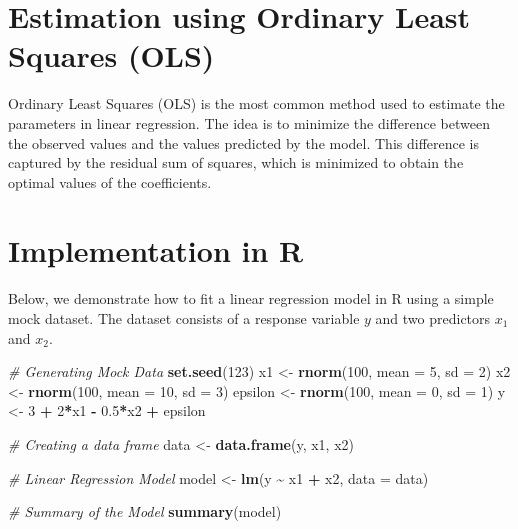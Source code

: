 \documentclass[
  12 pt,
  a4paper,
]{book}
\newenvironment{Shaded}{\begin{snugshade}}{\end{snugshade}}
\newcommand{\AttributeTok}[1]{\textcolor[rgb]{0.13,0.29,0.53}{#1}}
\newcommand{\CommentTok}[1]{\textcolor[rgb]{0.56,0.35,0.01}{\textit{#1}}}
\newcommand{\DecValTok}[1]{\textcolor[rgb]{0.00,0.00,0.81}{#1}}
\newcommand{\FloatTok}[1]{\textcolor[rgb]{0.00,0.00,0.81}{#1}}
\newcommand{\FunctionTok}[1]{\textcolor[rgb]{0.13,0.29,0.53}{\textbf{#1}}}
\newcommand{\NormalTok}[1]{#1}
\newcommand{\OtherTok}[1]{\textcolor[rgb]{0.56,0.35,0.01}{#1}}
\newcommand{\SpecialCharTok}[1]{\textcolor[rgb]{0.81,0.36,0.00}{\textbf{#1}}}
\numberwithin{equation}{section}
\theoremstyle{plain}      %
\theoremstyle{definition} %
\theoremstyle{remark}     %
\theoremstyle{note}         %
\begin{document}
\hypertarget{estimation-using-ordinary-least-squares-ols}{%
\section{Estimation using Ordinary Least Squares
(OLS)}\label{estimation-using-ordinary-least-squares-ols}}

Ordinary Least Squares (OLS) is the most common method used to estimate
the parameters in linear regression. The idea is to minimize the
difference between the observed values and the values predicted by the
model. This difference is captured by the residual sum of squares, which
is minimized to obtain the optimal values of the coefficients.

\hypertarget{implementation-in-r}{%
\section{Implementation in R}\label{implementation-in-r}}

Below, we demonstrate how to fit a linear regression model in R using a
simple mock dataset. The dataset consists of a response variable \(y\)
and two predictors \(x_1\) and \(x_2\).

\scriptsize

\begin{Shaded}
\begin{Highlighting}[]
\CommentTok{\# Generating Mock Data}
\FunctionTok{set.seed}\NormalTok{(}\DecValTok{123}\NormalTok{)}
\NormalTok{x1 }\OtherTok{\textless{}{-}} \FunctionTok{rnorm}\NormalTok{(}\DecValTok{100}\NormalTok{, }\AttributeTok{mean =} \DecValTok{5}\NormalTok{, }\AttributeTok{sd =} \DecValTok{2}\NormalTok{)}
\NormalTok{x2 }\OtherTok{\textless{}{-}} \FunctionTok{rnorm}\NormalTok{(}\DecValTok{100}\NormalTok{, }\AttributeTok{mean =} \DecValTok{10}\NormalTok{, }\AttributeTok{sd =} \DecValTok{3}\NormalTok{)}
\NormalTok{epsilon }\OtherTok{\textless{}{-}} \FunctionTok{rnorm}\NormalTok{(}\DecValTok{100}\NormalTok{, }\AttributeTok{mean =} \DecValTok{0}\NormalTok{, }\AttributeTok{sd =} \DecValTok{1}\NormalTok{)}
\NormalTok{y }\OtherTok{\textless{}{-}} \DecValTok{3} \SpecialCharTok{+} \DecValTok{2}\SpecialCharTok{*}\NormalTok{x1 }\SpecialCharTok{{-}} \FloatTok{0.5}\SpecialCharTok{*}\NormalTok{x2 }\SpecialCharTok{+}\NormalTok{ epsilon}

\CommentTok{\# Creating a data frame}
\NormalTok{data }\OtherTok{\textless{}{-}} \FunctionTok{data.frame}\NormalTok{(y, x1, x2)}

\CommentTok{\# Linear Regression Model}
\NormalTok{model }\OtherTok{\textless{}{-}} \FunctionTok{lm}\NormalTok{(y }\SpecialCharTok{\textasciitilde{}}\NormalTok{ x1 }\SpecialCharTok{+}\NormalTok{ x2, }\AttributeTok{data =}\NormalTok{ data)}

\CommentTok{\# Summary of the Model}
\FunctionTok{summary}\NormalTok{(model)}
\end{Highlighting}
\end{Shaded}
\end{document}
